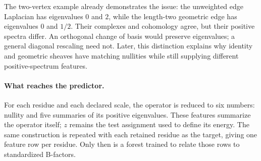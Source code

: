 The two-vertex example already demonstrates the issue: the unweighted edge Laplacian has eigenvalues $0$ and $2$, while the length-two geometric edge has eigenvalues $0$ and $1/2$. Their complexes and cohomology agree, but their positive spectra differ. An orthogonal change of basis would preserve eigenvalues; a general diagonal rescaling need not. Later, this distinction explains why identity and geometric sheaves have matching nullities while still supplying different positive-spectrum features.

\paragraph{What reaches the predictor.}
For each residue and each declared scale, the operator is reduced to six numbers: nullity and five summaries of its positive eigenvalues. These features summarize the operator itself; $z$ remains the test assignment used to define its energy. The same construction is repeated with each retained residue as the target, giving one feature row per residue. Only then is a forest trained to relate those rows to standardized B-factors.
